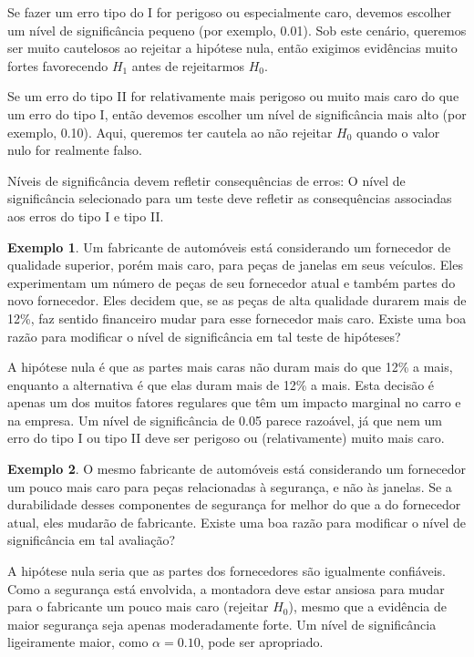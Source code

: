 \documentclass[
]{book}
\theoremstyle{definition}
\theoremstyle{definition}
\newtheorem{example}{Exemplo}[chapter]
\theoremstyle{definition}
\theoremstyle{definition}
\theoremstyle{remark}
\begin{document}
Se fazer um erro tipo do I for perigoso ou especialmente caro, devemos escolher um nível de significância pequeno (por exemplo, 0.01). Sob este cenário, queremos ser muito cautelosos ao rejeitar a hipótese nula, então exigimos evidências muito fortes favorecendo \(H_1\) antes de rejeitarmos \(H_0\).

Se um erro do tipo II for relativamente mais perigoso ou muito mais caro do que um erro do tipo I, então devemos escolher um nível de significância mais alto (por exemplo, 0.10). Aqui, queremos ter cautela ao não rejeitar \(H_0\) quando o valor nulo for realmente falso.

Níveis de significância devem refletir consequências de erros: O nível de significância selecionado para um teste deve refletir as consequências associadas aos erros do tipo I e tipo II.

\begin{example}
\protect\hypertarget{exm:unnamed-chunk-174}{}{\label{exm:unnamed-chunk-174} }Um fabricante de automóveis está considerando um fornecedor de qualidade superior, porém mais caro, para peças de janelas em seus veículos. Eles experimentam um número de peças de seu fornecedor atual e também partes do novo fornecedor. Eles decidem que, se as peças de alta qualidade durarem mais de 12\%, faz sentido financeiro mudar para esse fornecedor mais caro. Existe uma boa razão para modificar o nível de significância em tal teste de hipóteses?
\end{example}

A hipótese nula é que as partes mais caras não duram mais do que 12\% a mais, enquanto a alternativa é que elas duram mais de 12\% a mais. Esta decisão é apenas um dos muitos fatores regulares que têm um impacto marginal no carro e na empresa. Um nível de significância de 0.05 parece razoável, já que nem um erro do tipo I ou tipo II deve ser perigoso ou (relativamente) muito mais caro.

\begin{example}
\protect\hypertarget{exm:unnamed-chunk-175}{}{\label{exm:unnamed-chunk-175} }O mesmo fabricante de automóveis está considerando um fornecedor um pouco mais caro para peças relacionadas à segurança, e não às janelas. Se a durabilidade desses componentes de segurança for melhor do que a do fornecedor atual, eles mudarão de fabricante. Existe uma boa razão para modificar o nível de significância em tal avaliação?
\end{example}

A hipótese nula seria que as partes dos fornecedores são igualmente confiáveis. Como a segurança está envolvida, a montadora deve estar ansiosa para mudar para o fabricante um pouco mais caro (rejeitar \(H_0\)), mesmo que a evidência de maior segurança seja apenas moderadamente forte. Um nível de significância ligeiramente maior, como \(\alpha = 0.10\), pode ser apropriado.
\end{document}
